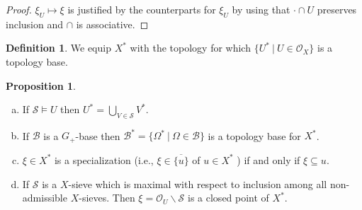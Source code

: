\documentclass[10pt]{article}
\numberwithin{equation}{section}
\theoremstyle{definition}
\newtheorem{proposition}{Proposition}[subsection]
\newtheorem{definition}{Definition}[subsection]
\newcommand{\Ouv}{\mathscr{O}}
\newcommand{\sep}[0]{\:|\:}
\newcommand{\sS}[0]{\mathscr{S}}
\newcommand{\cB}[0]{\mathcal{B}}
\begin{document}
\begin{proof}
    $\xi_U\mapsto\xi$ is justified by the counterparts for $\xi_U$ by using that $\cdot\cap U$ preserves inclusion and $\cap$ is associative.
\end{proof}
\begin{definition}
    \label{definition_9_11}
    We equip $X^*$ with the topology for which $\{U^*\sep U\in\Ouv_X\}$ is a topology base.
\end{definition}
\begin{proposition}$\:$
    \label{fact_9_3}
    \begin{enumerate}[a.]
        \item If $\sS\vDash U$ then $U^*=\bigcup_{V\in\sS}V^*$.
        \item If $\cB$ is a $G_+$-base then $\cB^*=\{\Omega^*\sep \Omega\in\cB\}$ is a topology base for $X^*$.
        \item $\xi\in X^*$ is a specialization (i.e., $\xi\in\overline{\{u\}}$ of $u\in X^*$ ) if and only if $\xi\subseteq u$.
        \item If $\sS$ is a $X$-sieve which is maximal with respect to inclusion among all non-admissible $X$-sieves. Then $\xi=\Ouv_U\backslash\sS$ is a closed point of $X^*$.
    \end{enumerate}
\end{proposition}
\end{document}
